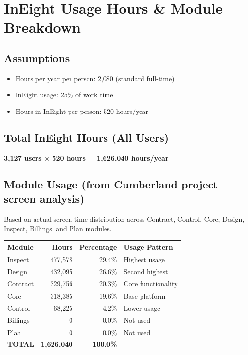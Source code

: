 \documentclass[11pt, letterpaper]{article}
\begin{document}
\vspace{1em}

\section*{InEight Usage Hours \& Module Breakdown}

\subsection*{Assumptions}
\begin{itemize}[nosep, leftmargin=2em]
    \item Hours per year per person: 2,080 (standard full-time)
    \item InEight usage: 25\% of work time
    \item Hours in InEight per person: 520 hours/year
\end{itemize}

\subsection*{Total InEight Hours (All Users)}
\textbf{3,127 users $\times$ 520 hours = 1,626,040 hours/year}

\subsection*{Module Usage (from Cumberland project screen analysis)}
Based on actual screen time distribution across Contract, Control, Core, Design, Inspect, Billings, and Plan modules.

\begin{center}
\footnotesize
\begin{tabularx}{\textwidth}{@{}l r r X@{}}
\toprule
\textbf{Module} & \textbf{Hours} & \textbf{Percentage} & \textbf{Usage Pattern} \\
\midrule
Inspect & 477,578 & 29.4\% & Highest usage \\
Design & 432,095 & 26.6\% & Second highest \\
Contract & 329,756 & 20.3\% & Core functionality \\
Core & 318,385 & 19.6\% & Base platform \\
Control & 68,225 & 4.2\% & Lower usage \\
Billings & 0 & 0.0\% & Not used \\
Plan & 0 & 0.0\% & Not used \\
\midrule
\textbf{TOTAL} & \textbf{1,626,040} & \textbf{100.0\%} & \\
\bottomrule
\end{tabularx}
\end{center}
\end{document}
